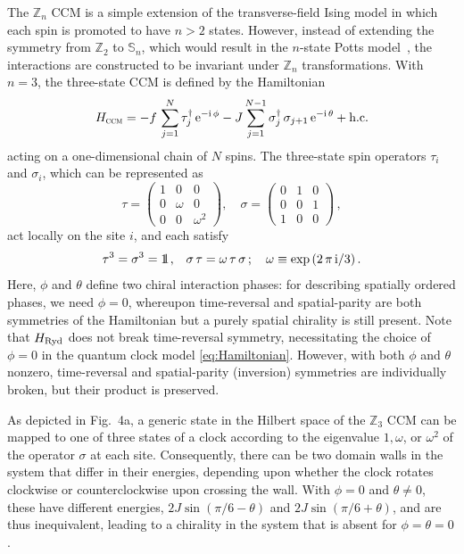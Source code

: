 \documentclass[prl,nobalancelastpage,superscriptaddress,twocolumn,nofootinbib]{revtex4}
\def\II{\hbox{$1\hskip -1.2pt\vrule depth 0pt height 1.6ex width 0.7pt\vrule depth 0pt height 0.3pt width 0.12em$}}
\begin{document}
The $\mathbb{Z}_n$ CCM is a simple extension of the transverse-field Ising model in which each spin is promoted to have $n>2$ states. However, instead of extending the symmetry from $\mathbb{Z}_2$ to $\mathbb{S}_n$, which would result in the $n$-state Potts model~\cite{wu1982potts}, the interactions are constructed to be invariant under $\mathbb{Z}_n$ transformations. With $n=3$, the three-state CCM is defined by the Hamiltonian~\cite{fendley2012parafermionic,Zhuang2015}
\begin{equation}
\label{eq:Hamiltonian}
H_{\textsc{ccm}} = -f \,\sum_{j=1}^N \tau_j^\dagger \,\mathrm{e}^{-\mathrm{i}\,\phi} - J \sum_{j =1}^{N-1} \sigma_j^\dagger \,\sigma_{j+1}\,\mathrm{e}^{-\mathrm{i}\,\theta} + \mbox{h.c.}
\end{equation}
acting on a one-dimensional chain of $N$ spins. The three-state spin operators $\tau_i$ and $\sigma_i$, which can be represented as
\begin{equation}
\tau=
  \begin{pmatrix}
    1 & 0 & 0 \\
    0 & \omega & 0\\
    0 & 0 & \omega^2
  \end{pmatrix},
  \quad
\sigma=
  \begin{pmatrix}
    0 & 1 & 0 \\
    0 & 0 & 1\\
    1 & 0 & 0
  \end{pmatrix} \,,
\end{equation}
act locally on the site $i$, and each satisfy 
\begin{align}
&\tau^3 = \sigma^3 = \II \,,
&\sigma\,\tau = \omega\,\tau\,\sigma\,; \quad \omega \equiv \exp\,(2\,\pi\,\mathrm{i}/3)\,.
\end{align}
Here, $\phi$ and $\theta$ define two chiral interaction phases: for describing spatially ordered phases, we need $\phi=0$, whereupon time-reversal and spatial-parity are both symmetries of the Hamiltonian but a purely spatial chirality is still present. Note that $H_{\rm Ryd}$ does not break time-reversal symmetry, necessitating the choice of $\phi=0$ in the quantum clock model \eqref{eq:Hamiltonian}. However, with both $\phi$ and $\theta$ nonzero, time-reversal and spatial-parity (inversion) symmetries are individually broken, but their product is preserved. 

As depicted in Fig.~4a, a generic state in the Hilbert space of the $\mathbb{Z}_3$ CCM can be mapped to one of three states of a clock according to the eigenvalue $1, \omega$, or $\omega^2$ of the operator $\sigma$ at each site. Consequently, there can be two domain walls in the system that differ in their energies, depending upon whether the clock rotates clockwise or counterclockwise upon crossing the wall. With $\phi = 0$ and $\theta \ne 0$, these have different energies, $2 J \sin(\pi/6 - \theta)$ and $2 J \sin(\pi/6 + \theta)$, and are thus inequivalent, leading to a chirality in the system that is absent for $\phi = \theta = 0$. 
\end{document}

